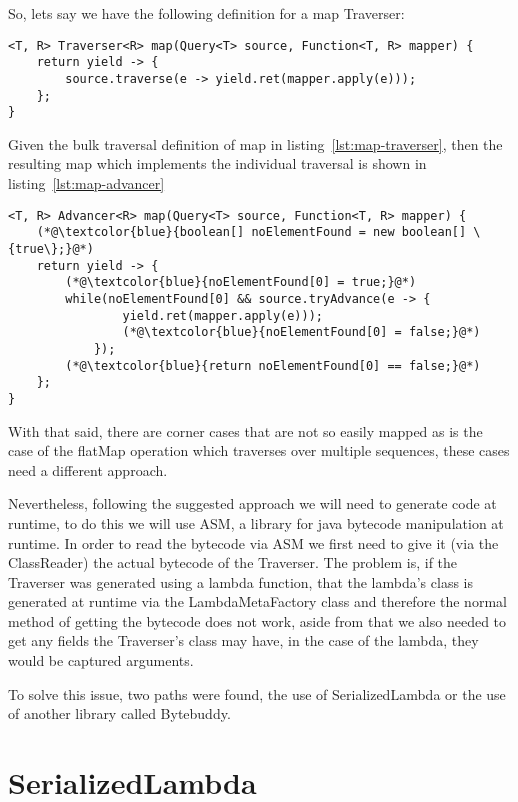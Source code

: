 So, lets say we have the following definition for a map Traverser:
\begin{lstlisting}[caption={Map Traverser},label={lst:map-traverser},captionpos=b]
<T, R> Traverser<R> map(Query<T> source, Function<T, R> mapper) {
	return yield -> {
    	source.traverse(e -> yield.ret(mapper.apply(e)));
	};
}
\end{lstlisting}

Given the bulk traversal definition of map in listing~\ref{lst:map-traverser}, then the resulting map which implements the individual traversal is shown in listing~\ref{lst:map-advancer}

\begin{lstlisting}[caption={Map Advancer},label={lst:map-advancer},captionpos=b]
<T, R> Advancer<R> map(Query<T> source, Function<T, R> mapper) {
	(*@\textcolor{blue}{boolean[] noElementFound = new boolean[] \{true\};}@*)
	return yield -> {
		(*@\textcolor{blue}{noElementFound[0] = true;}@*)
		while(noElementFound[0] && source.tryAdvance(e -> {
				yield.ret(mapper.apply(e)));
				(*@\textcolor{blue}{noElementFound[0] = false;}@*)
			});
		(*@\textcolor{blue}{return noElementFound[0] == false;}@*)
	};
}
\end{lstlisting}

With that said, there are corner cases that are not so easily mapped as is the case of the flatMap operation which traverses over multiple sequences, these cases need a different approach.

Nevertheless, following the suggested approach we will need to generate code at runtime, to do this we will use ASM, a library for java bytecode manipulation at runtime. In order to read the bytecode via ASM we first need to give it (via the ClassReader) the actual bytecode of the Traverser. The problem is, if the Traverser was generated using a lambda function, that the lambda's class is generated at runtime via the LambdaMetaFactory class and therefore the normal method of getting the bytecode does not work, aside from that we also needed to get any fields the Traverser's class may have, in the case of the lambda, they would be captured arguments.

To solve this issue, two paths were found\citep{stackoverflowlambdacode}, the use of SerializedLambda\citep{serializedlambda} or the use of another library called Bytebuddy.

\section{SerializedLambda}

